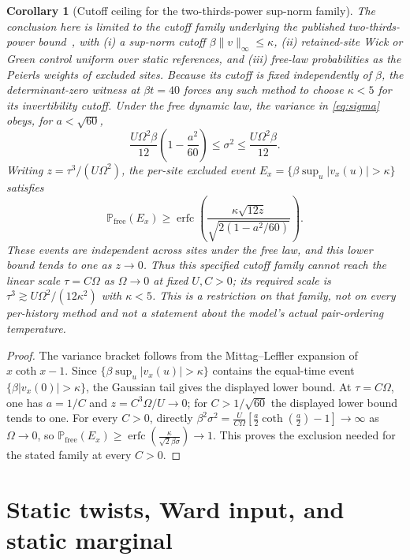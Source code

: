 \documentclass[11pt]{article}
\newtheorem{corollary}[theorem]{Corollary}
\theoremstyle{definition}
\theoremstyle{remark}
\DeclareMathOperator{\erfc}{erfc}
\newcommand{\free}{\mathrm{free}}
\begin{document}
\begin{corollary}[Cutoff ceiling for the two-thirds-power sup-norm family]\label{cor:cutoff}
The conclusion here is limited to the cutoff family underlying the published two-thirds-power bound~\cite{linear4}, with (i) a sup-norm cutoff $\beta\|v\|_\infty\leq\kappa$, (ii) retained-site Wick or Green control uniform over static references, and (iii) free-law probabilities as the Peierls weights of excluded sites. Because its cutoff is fixed independently of $\beta$, the determinant-zero witness at $\beta t=40$ forces any such method to choose $\kappa<5$ for its invertibility cutoff. Under the free dynamic law, the variance in \eqref{eq:sigma} obeys, for $a<\sqrt{60}$,
\[
 \frac{U\Omega^2\beta}{12}\left(1-\frac{a^2}{60}\right)\leq\sigma^2\leq\frac{U\Omega^2\beta}{12}.
\]
Writing $z=\tau^3/(U\Omega^2)$, the per-site excluded event $E_x=\{\beta\sup_u|v_x(u)|>\kappa\}$ satisfies
\[
 \mathbb P_{\free}(E_x)\geq
 \erfc\!\left(\frac{\kappa\sqrt{12z}}{\sqrt{2(1-a^2/60)}}\right).
\]
These events are independent across sites under the free law, and this lower bound tends to one as $z\to0$. Thus this specified cutoff family cannot reach the linear scale $\tau=C\Omega$ as $\Omega\to0$ at fixed $U,C>0$; its required scale is $\tau^3\gtrsim U\Omega^2/(12\kappa^2)$ with $\kappa<5$. This is a restriction on that family, not on every per-history method and not a statement about the model's actual pair-ordering temperature.
\end{corollary}

\begin{proof}
The variance bracket follows from the Mittag--Leffler expansion of $x\coth x-1$. Since $\{\beta\sup_u|v_x(u)|>\kappa\}$ contains the equal-time event $\{\beta|v_x(0)|>\kappa\}$, the Gaussian tail gives the displayed lower bound. At $\tau=C\Omega$, one has $a=1/C$ and $z=C^3\Omega/U\to0$; for $C>1/\sqrt{60}$ the displayed lower bound tends to one. For every $C>0$, directly $\beta^2\sigma^2=\frac{U}{C\Omega}\left[\frac a2\coth\left(\frac a2\right)-1\right]\to\infty$ as $\Omega\to0$, so $\mathbb P_{\free}(E_x)\geq\erfc\left(\frac{\kappa}{\sqrt{2}\beta\sigma}\right)\to1$. This proves the exclusion needed for the stated family at every $C>0$.
\end{proof}

\section{Static twists, Ward input, and static marginal}
\end{document}
